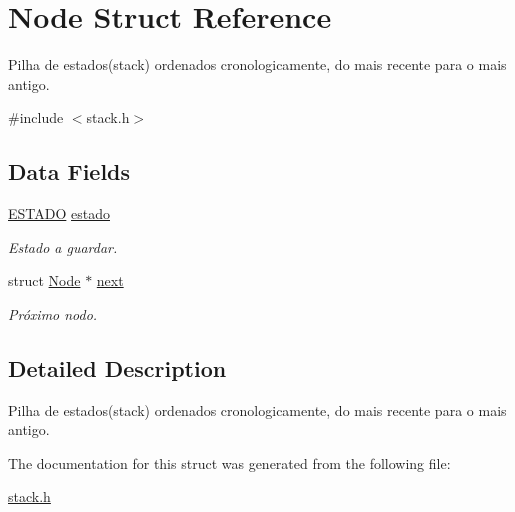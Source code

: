 \hypertarget{struct_node}{}\section{Node Struct Reference}
\label{struct_node}


Pilha de estados(stack) ordenados cronologicamente, do mais recente para o mais antigo.  




{\ttfamily \#include $<$stack.\+h$>$}

\subsection*{Data Fields}
\begin{DoxyCompactItemize}
\item 
\mbox{\label{struct_node_ab6f246f52bd4a806e3b6a0ebb6b2b8bb}} 
\hyperlink{estado_8h_a857f2529d823a22e6f4a81cf21fb810f}{E\+S\+T\+A\+DO} \hyperlink{struct_node_ab6f246f52bd4a806e3b6a0ebb6b2b8bb}{estado}
\begin{DoxyCompactList}\small\item\em Estado a guardar. \end{DoxyCompactList}\item 
\mbox{\label{struct_node_aa162dd1e0693188a22b1f13b9a2a0ef0}} 
struct \hyperlink{struct_node}{Node} $\ast$ \hyperlink{struct_node_aa162dd1e0693188a22b1f13b9a2a0ef0}{next}
\begin{DoxyCompactList}\small\item\em Próximo nodo. \end{DoxyCompactList}\end{DoxyCompactItemize}


\subsection{Detailed Description}
Pilha de estados(stack) ordenados cronologicamente, do mais recente para o mais antigo. 

The documentation for this struct was generated from the following file\+:\begin{DoxyCompactItemize}
\item 
\hyperlink{stack_8h}{stack.\+h}\end{DoxyCompactItemize}

